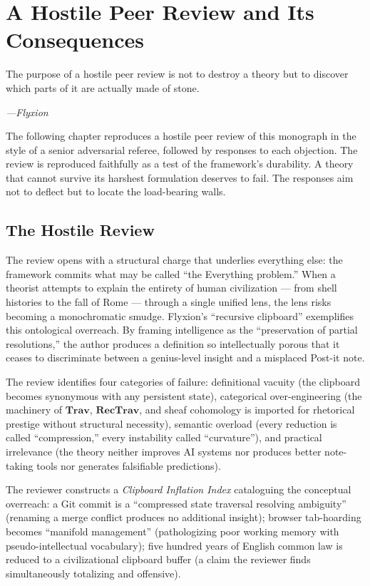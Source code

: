 \documentclass[12pt,oneside]{book}
\theoremstyle{plain}
\theoremstyle{definition}
\theoremstyle{plain}
\newcommand{\Trav}{\mathbf{Trav}}
\newcommand{\RecTrav}{\mathbf{RecTrav}}
\begin{document}
\chapter{A Hostile Peer Review and Its Consequences}
\label{ch:hostile}

\epigraph{The purpose of a hostile peer review is not to destroy a theory but to discover which parts of it are actually made of stone.}{\textit{---Flyxion}}

The following chapter reproduces a hostile peer review of this monograph in the style of a senior adversarial referee, followed by responses to each objection. The review is reproduced faithfully as a test of the framework's durability. A theory that cannot survive its harshest formulation deserves to fail. The responses aim not to deflect but to locate the load-bearing walls.

\section{The Hostile Review}

The review opens with a structural charge that underlies everything else: the framework commits what may be called ``the Everything problem.'' When a theorist attempts to explain the entirety of human civilization — from shell histories to the fall of Rome — through a single unified lens, the lens risks becoming a monochromatic smudge. Flyxion's ``recursive clipboard'' exemplifies this ontological overreach. By framing intelligence as the ``preservation of partial resolutions,'' the author produces a definition so intellectually porous that it ceases to discriminate between a genius-level insight and a misplaced Post-it note.

The review identifies four categories of failure: definitional vacuity (the clipboard becomes synonymous with any persistent state), categorical over-engineering (the machinery of $\Trav$, $\RecTrav$, and sheaf cohomology is imported for rhetorical prestige without structural necessity), semantic overload (every reduction is called ``compression,'' every instability called ``curvature''), and practical irrelevance (the theory neither improves AI systems nor produces better note-taking tools nor generates falsifiable predictions).

The reviewer constructs a \emph{Clipboard Inflation Index} cataloguing the conceptual overreach: a Git commit is a ``compressed state traversal resolving ambiguity'' (renaming a merge conflict produces no additional insight); browser tab-hoarding becomes ``manifold management'' (pathologizing poor working memory with pseudo-intellectual vocabulary); five hundred years of English common law is reduced to a civilizational clipboard buffer (a claim the reviewer finds simultaneously totalizing and offensive).
\end{document}
